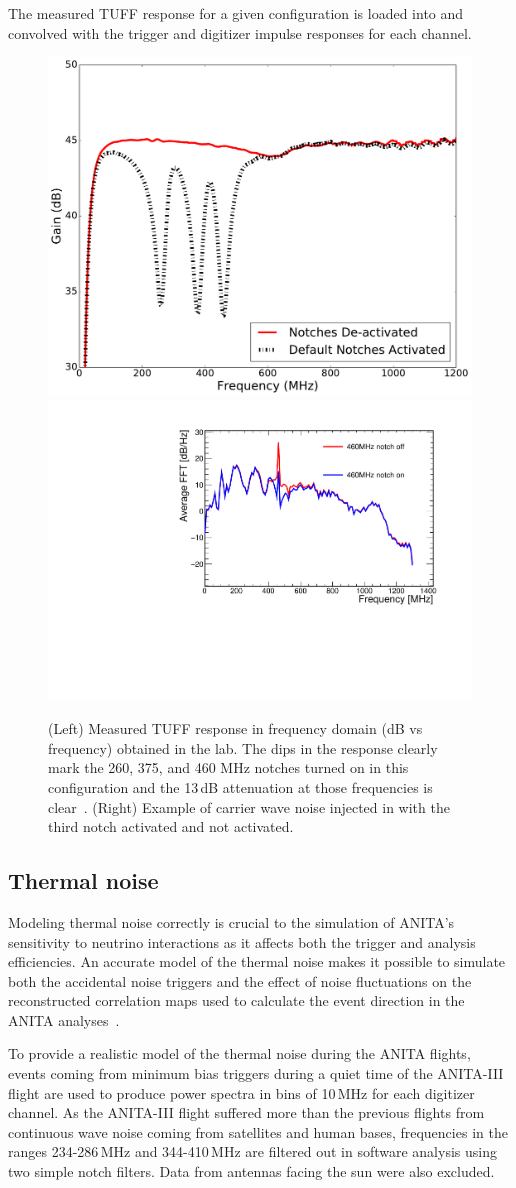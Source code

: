 The measured TUFF response for a given configuration is loaded
into \icemc and convolved with the trigger and digitizer impulse
responses for each channel. 

\begin{figure}
  \centering
 \includegraphics[width=0.4\linewidth] {./Figs/measured_gain_freq_on_off.pdf} 
 \includegraphics[width=0.45\linewidth] {./Figs/Icemc_tuffs.pdf} 
  \caption{(Left) Measured TUFF response in frequency domain (dB vs frequency) obtained in the lab. The dips in the response clearly mark the 260, 375, and 460 MHz notches turned on in this configuration and the 13\,dB attenuation at those frequencies is clear~\cite{Allison:2017vtk}.
  (Right) Example of carrier wave noise injected in \icemc with the third notch activated and not activated.}
\label{fig:TUFFs}
\end{figure}



\subsection{Thermal noise}
\label{subsec:ANITA_thermalNoise}
Modeling thermal noise correctly is crucial to the simulation of ANITA’s
sensitivity to neutrino interactions as it affects both the trigger and analysis efficiencies.
An accurate model of the thermal noise makes it possible to simulate both the
accidental noise triggers and the effect of noise fluctuations on the
reconstructed correlation maps used to calculate the event direction in the ANITA analyses~\cite{romero2015interferometric}.

To provide a realistic model of the thermal noise during the ANITA flights, events coming from minimum bias triggers during
a quiet time of the ANITA-III flight are used to produce power spectra in bins of 10\,MHz for each digitizer channel.
As the ANITA-III flight suffered more than the previous flights 
from continuous wave noise coming
from satellites and human bases, frequencies in the ranges
234-286\,MHz and 344-410\,MHz are filtered out in software analysis
using two simple notch filters. 
Data from antennas facing the sun were also excluded.

